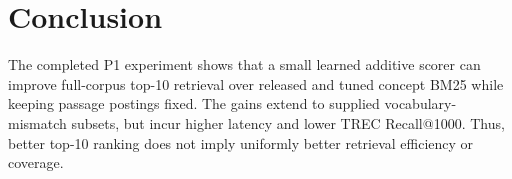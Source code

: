 \section{Conclusion}
The completed P1 experiment shows that a small learned additive scorer can
improve full-corpus top-10 retrieval over released and tuned concept BM25 while
keeping passage postings fixed. The gains extend to supplied vocabulary-mismatch
subsets, but incur higher latency and lower TREC Recall@1000. Thus, better
top-10 ranking does not imply uniformly better retrieval efficiency or coverage.
